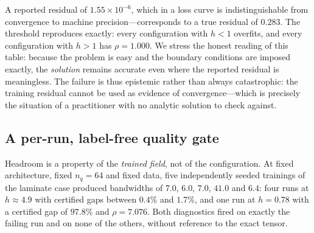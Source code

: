 \begin{table}[t]
\centering
\caption{Collocation overfitting in a vanilla PINN on 1D Poisson. The
reported residual is evaluated at the training points; the honest residual
on a $20\times$ finer grid. Bandwidth $6.0$ throughout.}
\label{tab:pinn}

\end{table}

A reported residual of $1.55\times10^{-6}$, which in a loss curve is
indistinguishable from convergence to machine precision---corresponds to a
true residual of $0.283$. The threshold reproduces exactly: every
configuration with $h<1$ overfits, and every configuration with $h>1$ has
$\rho = 1.000$. We stress the honest reading of this table: because the
problem is easy and the boundary conditions are imposed exactly, the
\emph{solution} remains accurate even where the reported residual is
meaningless. The failure is thus epistemic rather than always catastrophic: the training residual cannot be used as evidence of
convergence---which is precisely the situation of a practitioner with no
analytic solution to check against.

\subsection{A per-run, label-free quality gate}
\label{sec:quad:gate}

Headroom is a property of the \emph{trained field}, not of the
configuration. At fixed architecture, fixed $n_q = 64$ and fixed data,
five independently seeded trainings of the laminate case produced
bandwidths of $7.0$, $6.0$, $7.0$, $41.0$ and $6.4$: four runs at
$h \approx 4.9$ with certified gaps between $0.4\%$ and $1.7\%$, and one
run at $h = 0.78$ with a certified gap of $97.8\%$ and $\rho = 7.076$. Both
diagnostics fired on exactly the failing run and on none of the others,
without reference to the exact tensor.

